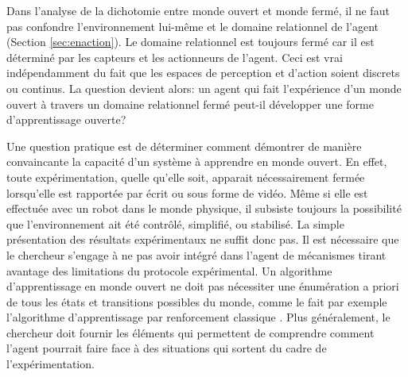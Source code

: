 Dans l'analyse de la dichotomie entre monde ouvert et monde fermé, il ne faut pas confondre  l'environnement lui-même et le domaine relationnel de l'agent (Section \ref{sec:enaction}). 
Le domaine relationnel est toujours fermé car il est déterminé par les capteurs et les actionneurs de l'agent. 
Ceci est vrai indépendamment du fait que les espaces de perception et d'action soient discrets ou continus. 
La question devient alors: un agent qui fait l'expérience d'un monde ouvert à travers un domaine relationnel fermé peut-il développer une forme d'apprentissage ouverte? 

Une question pratique est de déterminer comment démontrer de manière convaincante la capacité d'un système à apprendre en monde ouvert. 
En effet, toute expérimentation, quelle qu'elle soit, apparait nécessairement fermée lorsqu'elle est rapportée par écrit ou sous forme de vidéo. 
Même si elle est effectuée avec un robot dans le monde physique, il subsiste toujours la possibilité que l'environnement ait été contrôlé, simplifié, ou stabilisé.
La simple présentation des résultats expérimentaux ne suffit donc pas.
Il est nécessaire que le chercheur s'engage à ne pas avoir intégré dans l'agent de mécanismes tirant avantage des limitations du protocole expérimental. 
Un algorithme d'apprentissage en monde ouvert ne doit pas nécessiter une énumération a priori de tous les états et transitions possibles du monde, comme le fait par exemple l'algorithme d'apprentissage par renforcement classique .
Plus généralement, le chercheur doit fournir les éléments qui permettent de comprendre comment l'agent pourrait faire face à des situations qui sortent du cadre de l'expérimentation. 







